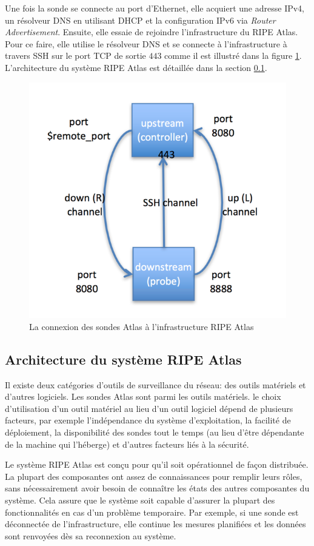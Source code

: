 Une fois la sonde se connecte au port d'Ethernet, elle acquiert  une adresse IPv4, un résolveur DNS  en utilisant DHCP et la configuration IPv6 via \textit{Router Advertisement}. Ensuite, elle essaie de rejoindre l'infrastructure du RIPE Atlas. Pour ce faire, elle utilise le résolveur DNS et se connecte à l'infrastructure à travers SSH sur le port TCP de sortie $443$ comme il est illustré dans la figure \ref{fig:ssh-atlas-probe}. L'architecture du système RIPE Atlas est détaillée dans la section \ref{subsec:archi-probes}.

\begin{figure}[H]
	\centering
	\captionsetup{justification=centering}
	\includegraphics[width=0.5\linewidth]{illustrations/ssh-atlas-probe}
	\caption{La connexion des sondes Atlas à l'infrastructure RIPE Atlas \cite{how-we-manage-our-probe}}
	\label{fig:ssh-atlas-probe}
\end{figure}

\subsection{Architecture du système RIPE Atlas} \label{subsec:archi-probes}

Il existe deux catégories d'outils de surveillance du réseau: des outils matériels et d'autres logiciels. Les sondes  Atlas sont parmi les outils matériels. le choix d'utilisation d'un outil matériel au lieu d'un outil logiciel dépend de plusieurs facteurs, par exemple l'indépendance du système d'exploitation, la facilité de déploiement, la disponibilité des sondes tout le temps (au lieu d'être dépendante de la machine qui l'héberge) et d'autres facteurs liés à la sécurité.

Le système RIPE Atlas est conçu pour qu'il soit opérationnel de façon distribuée. La plupart des composantes ont assez de connaissances pour remplir leurs rôles, sans nécessairement avoir besoin de connaître les états des autres composantes du système. Cela assure que le système soit capable d'assurer la plupart des fonctionnalités en cas  d'un problème temporaire. Par exemple, si une sonde est déconnectée de l'infrastructure, elle continue les mesures planifiées et les données sont renvoyées dès sa reconnexion au système.


